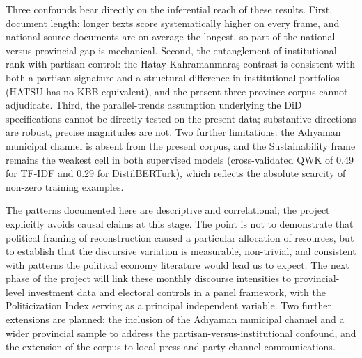 \documentclass[12pt, journal]{IEEEtran}
\begin{document}
Three confounds bear directly on the inferential reach of these results. First, document length: longer texts score systematically higher on every frame, and national-source documents are on average the longest, so part of the national-versus-provincial gap is mechanical. Second, the entanglement of institutional rank with partisan control: the Hatay-Kahramanmara\c{s} contrast is consistent with both a partisan signature and a structural difference in institutional portfolios (HATSU has no KBB equivalent), and the present three-province corpus cannot adjudicate. Third, the parallel-trends assumption underlying the DiD specifications cannot be directly tested on the present data; substantive directions are robust, precise magnitudes are not. Two further limitations: the Ad\i yaman municipal channel is absent from the present corpus, and the Sustainability frame remains the weakest cell in both supervised models (cross-validated QWK of 0.49 for TF-IDF and 0.29 for DistilBERTurk), which reflects the absolute scarcity of non-zero training examples.

The patterns documented here are descriptive and correlational; the project explicitly avoids causal claims at this stage. The point is not to demonstrate that political framing of reconstruction caused a particular allocation of resources, but to establish that the discursive variation is measurable, non-trivial, and consistent with patterns the political economy literature would lead us to expect. The next phase of the project will link these monthly discourse intensities to provincial-level investment data and electoral controls in a panel framework, with the Politicization Index serving as a principal independent variable. Two further extensions are planned: the inclusion of the Ad\i yaman municipal channel and a wider provincial sample to address the partisan-versus-institutional confound, and the extension of the corpus to local press and party-channel communications.





\end{document}
